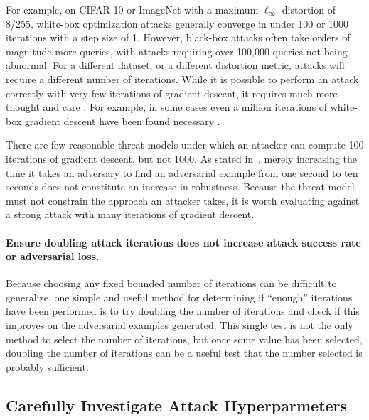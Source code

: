 \documentclass{article} %
\begin{document}
For example, on
CIFAR-10 or ImageNet with a maximum $\ell_\infty$ distortion of 8/255,
white-box optimization attacks generally converge in under 100 or 1000
iterations with a step size of 1.
%
However, black-box attacks often take orders of magnitude more queries,
with attacks requiring over 100,000 queries not being abnormal.
%
For a different dataset, or a different
distortion metric, attacks will require a different number of iterations.
%
While it is
possible to perform an attack correctly with very few iterations
of gradient descent, it requires much more thought and care \citep{engstrom2018evaluating}.
%
For example, in some cases even a million iterations of white-box gradient descent
have been found necessary \citep{qian2018l2}.

There are few reasonable threat models under which an attacker can
compute 100 iterations of gradient descent, but not 1000. As stated in~\cite{athalye2018obfuscated}, merely increasing the time it takes an adversary to find an adversarial example from one second to ten seconds does not constitute an increase in robustness.
%
Because the threat model must not constrain the approach an
attacker takes, it is worth evaluating against a strong attack
with many iterations of gradient descent.

\paragraph{Ensure doubling attack iterations does not increase attack success rate or adversarial loss.}
%
Because choosing any fixed bounded number of iterations can be difficult to
generalize, one simple and useful method for determining if ``enough'' iterations
have been performed is to try doubling the number of iterations and check if this
improves on the adversarial examples generated.
%
This single test is not the only method to select the number of iterations,
but once some value has been selected, doubling the number of iterations
can be a useful test that the number selected is probably sufficient.



\subsection{Carefully Investigate Attack Hyperparmeters}
\label{sec:hyperparams}
\end{document}
